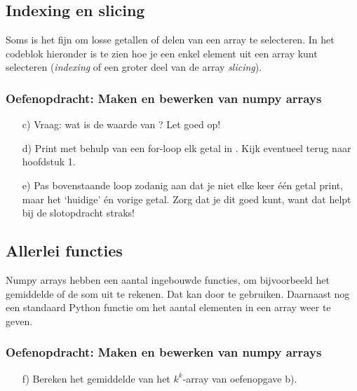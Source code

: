 \documentclass[a4paper,11pt, fleqn]{article}
\begin{document}
\subsection{Indexing en slicing}
Soms is het fijn om losse getallen of delen van een array te selecteren. In het codeblok hieronder is te zien hoe je een enkel element uit een array kunt selecteren {(\it indexing} of een groter deel van de array {\it slicing}). 


\subsubsection*{Oefenopdracht: Maken en bewerken van numpy arrays}
\begin{itemize}
	\item[c)] Vraag: wat is de waarde van ? Let goed op!
	\item[d)] Print met behulp van een for-loop elk getal in . Kijk eventueel terug naar hoofdstuk 1.
	\item[e)] Pas bovenstaande loop zodanig aan dat je niet elke keer \'e\'en getal print, maar het `huidige' \'en vorige getal. Zorg dat je dit goed kunt, want dat helpt bij de slotopdracht straks!
\end{itemize}

\subsection{Allerlei functies}
Numpy arrays hebben een aantal ingebouwde functies, om bijvoorbeeld het gemiddelde of de som uit te rekenen. Dat kan door  te gebruiken. Daarnaast nog een standaard Python functie om het aantal elementen in een array weer te geven.


\subsubsection*{Oefenopdracht: Maken en bewerken van numpy arrays}
\begin{itemize}
	\item[f)] Bereken het gemiddelde van het $k^k$-array van oefenopgave b).
\end{itemize}
\end{document}
